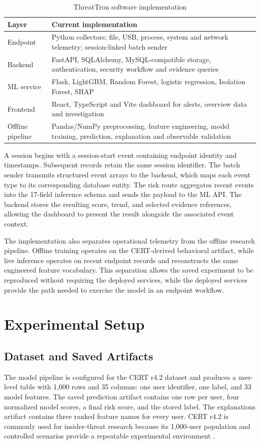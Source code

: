 \begin{table}[t]
\caption{ThreatTron software implementation}
\label{tab:implementation}
\centering
\footnotesize
\begin{tabular}{p{}p{}}
\toprule
Layer & Current implementation \\
\midrule
Endpoint & Python collectors; file, USB, process, system and network telemetry; session-linked batch sender \\
Backend & FastAPI, SQLAlchemy, MySQL-compatible storage, authentication, security workflow and evidence queries \\
ML service & Flask, LightGBM, Random Forest, logistic regression, Isolation Forest, SHAP \\
Frontend & React, TypeScript and Vite dashboard for alerts, overview data and investigation \\
Offline pipeline & Pandas/NumPy preprocessing, feature engineering, model training, prediction, explanation and observable validation \\
\bottomrule
\end{tabular}
\end{table}

A session begins with a session-start event containing endpoint identity and timestamps. Subsequent records retain the same session identifier. The batch sender transmits structured event arrays to the backend, which maps each event type to its corresponding database entity. The risk route aggregates recent events into the 17-field inference schema and sends the payload to the ML API. The backend stores the resulting score, trend, and selected evidence references, allowing the dashboard to present the result alongside the associated event context.

The implementation also separates operational telemetry from the offline research pipeline. Offline training operates on the CERT-derived behavioral artifact, while live inference operates on recent endpoint records and reconstructs the same engineered feature vocabulary. This separation allows the saved experiment to be reproduced without requiring the deployed services, while the deployed services provide the path needed to exercise the model in an endpoint workflow.

\section{Experimental Setup}
\subsection{Dataset and Saved Artifacts}
The model pipeline is configured for the CERT r4.2 dataset and produces a user-level table with 1,000 rows and 35 columns: one user identifier, one label, and 33 model features. The saved prediction artifact contains one row per user, four normalized model scores, a final risk score, and the stored label. The explanations artifact contains three ranked feature names for every user. CERT r4.2 is commonly used for insider-threat research because its 1,000-user population and controlled scenarios provide a repeatable experimental environment \cite{cert2020}.

